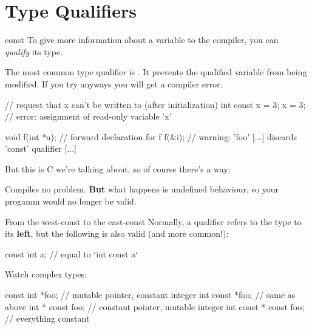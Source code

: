 \documentclass[10pt,graphics,aspectratio=169,table]{beamer}
\begin{document}
\section{Type Qualifiers}
\begin{frame}[fragile]{const}
    To give more information about a variable to the compiler, you can\\
    \textit{qualify} its type. 
    
    The most common type qualifier is .
    It prevents the qualified variable from being modified.
    If you try anyways you will get a compiler error.

    \begin{codeblock}
// request that x can't be written to (after initialization)
int const x = 3; 
x = 3; // error: assignment of read-only variable 'x'

void f(int *a); // forward declaration for f
f(&i); // warning: 'foo' [...] discards 'const' qualifier [...]
    \end{codeblock}

    But this is C we're talking about, so of course there's a way: 

    Compiles no problem. \textbf{But} what happens is undefined behaviour,
    so your progamm would no longer be valid.

\end{frame}

\begin{frame}[fragile]{From the west-const to the east-const}
    \bigskip
    Normally, a qualifier refers to the type to its \textbf{left},
    but the following is also valid (and more common!):
    \begin{codeblock}
const int a;	        // equal to `int const a`
    \end{codeblock}

    Watch complex types:
    
    \begin{codeblock}
const int *foo;         // mutable pointer, constant integer
int const *foo;	        // same as above
int * const foo;        // constant pointer, mutable integer 
int const * const foo;  // everything constant 
    \end{codeblock}
    \end{frame}
\end{document}
